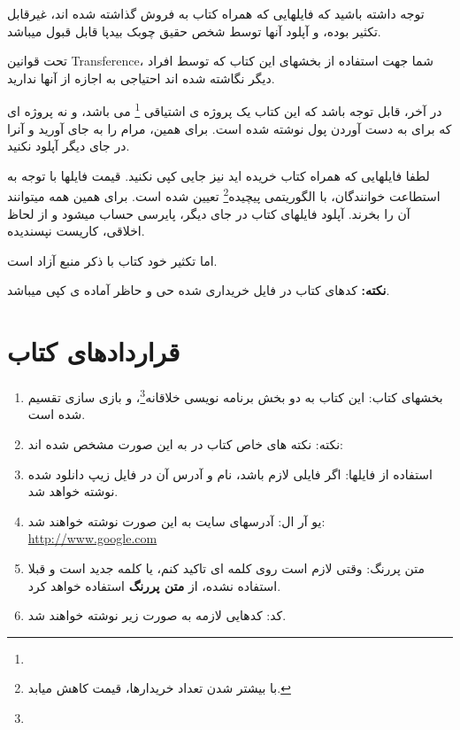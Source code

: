 \documentclass[14pt,a4paper]{memoir}
\begin{document}
	 توجه داشته باشید که فایلهایی که همراه کتاب به فروش گذاشته شده اند، غیرقابل تکثیر بوده، و آپلود آنها توسط شخص حقیق چوبک بیدپا قابل قبول میباشد.
	 
	 تحت قوانین Transference، شما جهت استفاده از بخشهای این کتاب که توسط افراد دیگر نگاشته شده اند احتیاجی به اجازه از آنها ندارید.
	 
	 در آخر، قابل توجه باشد که این کتاب یک پروژه ی اشتیاقی \footnote{} می باشد، و نه پروژه ای که برای به دست آوردن پول نوشته شده است. برای همین، مرام را به جای آورید و آنرا در جای دیگر آپلود نکنید.
	 
	 لطفا فایلهایی که همراه کتاب خریده اید نیز جایی کپی نکنید. قیمت فایلها با توجه به استطاعت خوانندگان، با الگوریتمی پیچیده\footnote{با بیشتر شدن تعداد خریدارها، قیمت کاهش میابد.} تعیین شده است. برای همین همه میتوانند آن را بخرند. آپلود فایلهای کتاب در جای دیگر، پایرسی حساب میشود و از لحاظ اخلاقی، کاریست نپسندیده.
	 
	 اما تکثیر خود کتاب با ذکر منبع آزاد است.
	  
	 \textbf{نکته:} کدهای کتاب در فایل خریداری شده حی و حاظر آماده ی کپی میباشد.
	 
	 
	 
	 \chapter*{قراردادهای کتاب}
	 
	 \begin{enumerate}
	 	\item  بخشهای کتاب: این کتاب به دو بخش برنامه نویسی خلاقانه\footnote{}، و بازی سازی تقسیم شده است.
	 	\item  نکته: نکته های خاص کتاب در به این صورت مشخص شده اند:
	 		
	 
	 \item استفاده از فایلها: اگر فایلی لازم باشد، نام و آدرس آن در فایل زیپ دانلود شده نوشته خواهد شد.
	 \item یو آر ال: آدرسهای سایت به این صورت نوشته خواهند شد: \url{http://www.google.com} 
	 \item متن پررنگ: وقتی لازم است روی کلمه ای تاکید کنم، یا کلمه جدید است و قبلا استفاده نشده، از \textbf{متن پررنگ} استفاده خواهد کرد.
	 \item کد: کدهایی لازمه به صورت زیر نوشته خواهند شد.
	 
	 
	\begin{latin}
	
	\end{latin}
	 
	\end{enumerate}
	 
\end{document}
